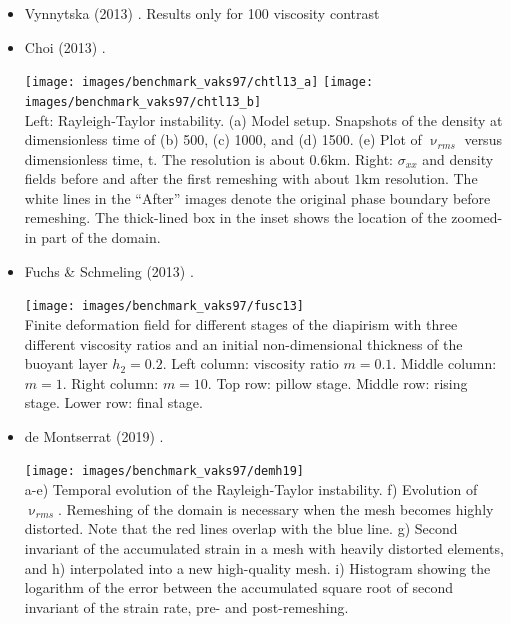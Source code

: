 \begin{itemize}
\item Vynnytska \etal (2013) \cite{vyrc13}. Results only for 100 viscosity contrast


\item Choi \etal (2013) \cite{chtl13}.

\begin{center}
\texttt{[image: images/benchmark\_vaks97/chtl13\_a]}
\texttt{[image: images/benchmark\_vaks97/chtl13\_b]}\\
{\captionfont 
Left:
Rayleigh-Taylor instability. (a) Model setup. Snapshots of the density at dimensionless 
time of (b) 500, (c) 1000, and (d) 1500. (e) Plot of $\upnu_{rms}$ versus dimensionless time, t. 
The resolution is about $0.6\si{\kilo\metre}$. 
Right:
$\sigma_{xx}$ and density fields before and after the first remeshing with about $1\si{\kilo\metre}$ 
resolution. 
The white lines in the ``After'' images denote the original phase boundary before remeshing. 
The thick-lined box in the inset shows the location of the zoomed-in part of the domain.}
\end{center}


\item Fuchs \& Schmeling (2013) \cite{fusc13}.

\begin{minipage}{.99\linewidth}
\begin{center}
\texttt{[image: images/benchmark\_vaks97/fusc13]}\\
{\captionfont 
Finite deformation field for different stages of the diapirism with three 
different viscosity ratios and an initial non-dimensional thickness of 
the buoyant layer $h_2=0.2$. 
Left column: viscosity ratio $m = 0.1$. 
Middle column: $m = 1$. 
Right column: $m = 10$. 
Top row: pillow stage. 
Middle row: rising stage. 
Lower row: final stage. }
\end{center}
\end{minipage}


\item de Montserrat \etal (2019) \cite{demh19}.


\begin{center}
\texttt{[image: images/benchmark\_vaks97/demh19]}\\
{\captionfont 
a-e) Temporal evolution of the Rayleigh-Taylor instability. 
f) Evolution of $\upnu_{rms}$. 
Remeshing of the domain is necessary when the mesh becomes highly distorted. 
Note that the red lines overlap with the blue line. 
g) Second invariant of the accumulated strain in a mesh with heavily distorted elements, 
and h) interpolated into a new high-quality mesh. 
i) Histogram showing the logarithm of the error between the accumulated square root of 
second invariant of the strain rate, pre- and post-remeshing.}
\end{center}



\end{itemize}

